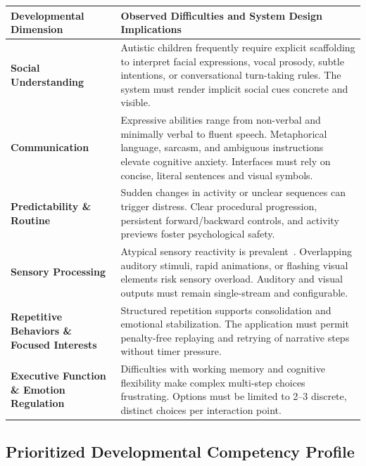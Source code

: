 \begin{xltabular}{\textwidth}{|p{4.0cm}|X|}
\hline
\textbf{Developmental Dimension} & \textbf{Observed Difficulties and System Design Implications} \\ \hline
\endhead
\textbf{Social Understanding} & Autistic children frequently require explicit scaffolding to interpret facial expressions, vocal prosody, subtle intentions, or conversational turn-taking rules. The system must render implicit social cues concrete and visible. \\ \hline
\textbf{Communication} & Expressive abilities range from non-verbal and minimally verbal to fluent speech. Metaphorical language, sarcasm, and ambiguous instructions elevate cognitive anxiety. Interfaces must rely on concise, literal sentences and visual symbols. \\ \hline
\textbf{Predictability \& Routine} & Sudden changes in activity or unclear sequences can trigger distress. Clear procedural progression, persistent forward/backward controls, and activity previews foster psychological safety. \\ \hline
\textbf{Sensory Processing} & Atypical sensory reactivity is prevalent~\cite{cdc_symptoms}. Overlapping auditory stimuli, rapid animations, or flashing visual elements risk sensory overload. Auditory and visual outputs must remain single-stream and configurable. \\ \hline
\textbf{Repetitive Behaviors \& Focused Interests} & Structured repetition supports consolidation and emotional stabilization. The application must permit penalty-free replaying and retrying of narrative steps without timer pressure. \\ \hline
\textbf{Executive Function \& Emotion Regulation} & Difficulties with working memory and cognitive flexibility make complex multi-step choices frustrating. Options must be limited to 2--3 discrete, distinct choices per interaction point. \\ \hline
\end{xltabular}
\label{tab:c2_asd_dimensions}

\subsection{Prioritized Developmental Competency Profile}


